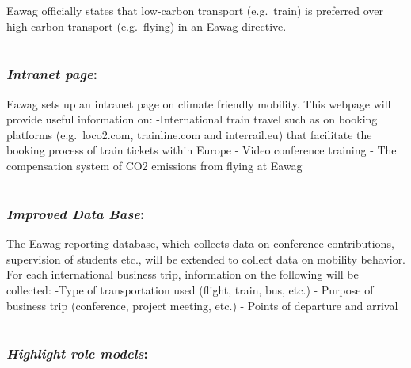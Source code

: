 \documentclass[]{tufte-handout}
\begin{document}
Eawag officially states that low-carbon transport (e.g.~train) is
preferred over high-carbon transport (e.g.~flying) in an Eawag
directive.

\hypertarget{intranet}{%
\section{}\label{intranet}}

\hypertarget{intranet-page}{%
\subsubsection{\texorpdfstring{\emph{Intranet
page}:}{Intranet page:}}\label{intranet-page}}

Eawag sets up an intranet page on climate friendly mobility. This
webpage will provide useful information on: -International train travel
such as on booking platforms (e.g.~loco2.com, trainline.com and
interrail.eu) that facilitate the booking process of train tickets
within Europe - Video conference training - The compensation system of
CO2 emissions from flying at Eawag

\hypertarget{database}{%
\section{}\label{database}}

\hypertarget{improved-data-base}{%
\subsubsection{\texorpdfstring{\emph{Improved Data
Base}:}{Improved Data Base:}}\label{improved-data-base}}

The Eawag reporting database, which collects data on conference
contributions, supervision of students etc., will be extended to collect
data on mobility behavior. For each international business trip,
information on the following will be collected: -Type of transportation
used (flight, train, bus, etc.) - Purpose of business trip (conference,
project meeting, etc.) - Points of departure and arrival

\hypertarget{role_models}{%
\section{}\label{role_models}}

\hypertarget{highlight-role-models}{%
\subsubsection{\texorpdfstring{\emph{Highlight role
models}:}{Highlight role models:}}\label{highlight-role-models}}
\end{document}
